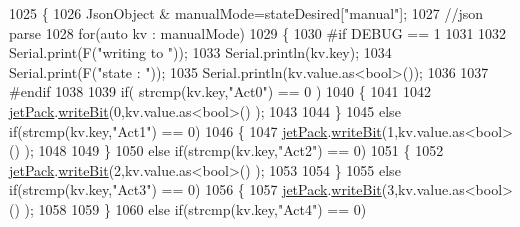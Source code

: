 \begin{DoxyCode}
1025             \{ 
1026                 JsonObject & manualMode=stateDesired[\textcolor{stringliteral}{"manual"}];
1027                 \textcolor{comment}{//json parse}
1028                 \textcolor{keywordflow}{for}(\textcolor{keyword}{auto} kv : manualMode)
1029                 \{
1030 \textcolor{preprocessor}{                #if DEBUG == 1}
1031 
1032                     Serial.print(F(\textcolor{stringliteral}{"writing to "}));
1033                     Serial.println(kv.key);
1034                     Serial.print(F(\textcolor{stringliteral}{"state : "}));
1035                     Serial.println(kv.value.as<\textcolor{keywordtype}{bool}>());        
1036                     
1037 \textcolor{preprocessor}{                #endif              }
1038 
1039                     \textcolor{keywordflow}{if}( strcmp(kv.key,\textcolor{stringliteral}{"Act0"}) == 0 )
1040                     \{
1041                     
1042                         \hyperlink{class_cool_board_a30b1357881b01ccbec676856a91e48e9}{jetPack}.\hyperlink{class_jetpack_a79ae7bc3c1828a0551a7c005c4f8bd00}{writeBit}(0,kv.value.as<\textcolor{keywordtype}{bool}>() ); 
1043                         
1044                     \}
1045                     \textcolor{keywordflow}{else} \textcolor{keywordflow}{if}(strcmp(kv.key,\textcolor{stringliteral}{"Act1"}) == 0)
1046                     \{
1047                         \hyperlink{class_cool_board_a30b1357881b01ccbec676856a91e48e9}{jetPack}.\hyperlink{class_jetpack_a79ae7bc3c1828a0551a7c005c4f8bd00}{writeBit}(1,kv.value.as<\textcolor{keywordtype}{bool}>() ); 
1048 
1049                     \}
1050                     \textcolor{keywordflow}{else} \textcolor{keywordflow}{if}(strcmp(kv.key,\textcolor{stringliteral}{"Act2"}) == 0)
1051                     \{
1052                         \hyperlink{class_cool_board_a30b1357881b01ccbec676856a91e48e9}{jetPack}.\hyperlink{class_jetpack_a79ae7bc3c1828a0551a7c005c4f8bd00}{writeBit}(2,kv.value.as<\textcolor{keywordtype}{bool}>() ); 
1053 
1054                     \}
1055                     \textcolor{keywordflow}{else} \textcolor{keywordflow}{if}(strcmp(kv.key,\textcolor{stringliteral}{"Act3"}) == 0)
1056                     \{
1057                         \hyperlink{class_cool_board_a30b1357881b01ccbec676856a91e48e9}{jetPack}.\hyperlink{class_jetpack_a79ae7bc3c1828a0551a7c005c4f8bd00}{writeBit}(3,kv.value.as<\textcolor{keywordtype}{bool}>() ); 
1058 
1059                     \}
1060                     \textcolor{keywordflow}{else} \textcolor{keywordflow}{if}(strcmp(kv.key,\textcolor{stringliteral}{"Act4"}) == 0)

\end{DoxyCode}
